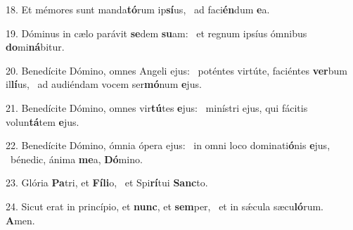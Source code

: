 18. Et mémores sunt manda\textbf{tó}rum ip\textbf{sí}us, \ast\  ad faci\textbf{én}dum \textbf{e}a.\

19. Dóminus in cælo parávit \textbf{se}dem \textbf{su}am: \ast\  et regnum ipsíus ómnibus \textbf{do}mi\textbf{ná}bitur.\

20. Benedícite Dómino, omnes Angeli ejus: \dag\  poténtes virtúte, faciéntes \textbf{ver}bum il\textbf{lí}us, \ast\  ad audiéndam vocem ser\textbf{mó}num \textbf{e}jus.\

21. Benedícite Dómino, omnes vir\textbf{tú}tes \textbf{e}jus: \ast\  minístri ejus, qui fácitis volun\textbf{tá}tem \textbf{e}jus.\

22. Benedícite Dómino, ómnia ópera ejus: \dag\  in omni loco dominati\textbf{ó}nis \textbf{e}jus, \ast\  bénedic, ánima \textbf{me}a, \textbf{Dó}mino.\

23. Glória \textbf{Pa}tri, et \textbf{Fí}\textbf{li}o, \ast\  et Spi\textbf{rí}tui \textbf{Sanc}to.\

24. Sicut erat in princípio, et \textbf{nunc}, et \textbf{sem}per, \ast\  et in sǽcula sæcu\textbf{ló}rum. \textbf{A}men.\

